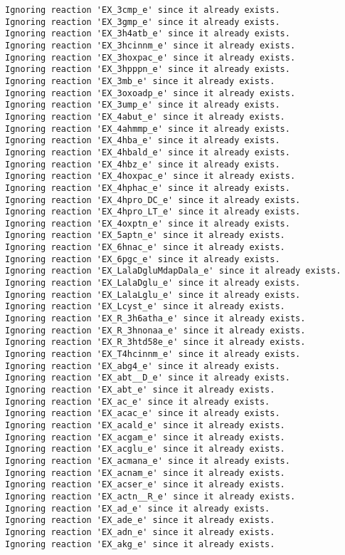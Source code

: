 \documentclass[
  letterpaper,
  DIV=11,
  numbers=noendperiod]{scrartcl}
\begin{document}
\begin{verbatim}
Ignoring reaction 'EX_3cmp_e' since it already exists.
Ignoring reaction 'EX_3gmp_e' since it already exists.
Ignoring reaction 'EX_3h4atb_e' since it already exists.
Ignoring reaction 'EX_3hcinnm_e' since it already exists.
Ignoring reaction 'EX_3hoxpac_e' since it already exists.
Ignoring reaction 'EX_3hpppn_e' since it already exists.
Ignoring reaction 'EX_3mb_e' since it already exists.
Ignoring reaction 'EX_3oxoadp_e' since it already exists.
Ignoring reaction 'EX_3ump_e' since it already exists.
Ignoring reaction 'EX_4abut_e' since it already exists.
Ignoring reaction 'EX_4ahmmp_e' since it already exists.
Ignoring reaction 'EX_4hba_e' since it already exists.
Ignoring reaction 'EX_4hbald_e' since it already exists.
Ignoring reaction 'EX_4hbz_e' since it already exists.
Ignoring reaction 'EX_4hoxpac_e' since it already exists.
Ignoring reaction 'EX_4hphac_e' since it already exists.
Ignoring reaction 'EX_4hpro_DC_e' since it already exists.
Ignoring reaction 'EX_4hpro_LT_e' since it already exists.
Ignoring reaction 'EX_4oxptn_e' since it already exists.
Ignoring reaction 'EX_5aptn_e' since it already exists.
Ignoring reaction 'EX_6hnac_e' since it already exists.
Ignoring reaction 'EX_6pgc_e' since it already exists.
Ignoring reaction 'EX_LalaDgluMdapDala_e' since it already exists.
Ignoring reaction 'EX_LalaDglu_e' since it already exists.
Ignoring reaction 'EX_LalaLglu_e' since it already exists.
Ignoring reaction 'EX_Lcyst_e' since it already exists.
Ignoring reaction 'EX_R_3h6atha_e' since it already exists.
Ignoring reaction 'EX_R_3hnonaa_e' since it already exists.
Ignoring reaction 'EX_R_3htd58e_e' since it already exists.
Ignoring reaction 'EX_T4hcinnm_e' since it already exists.
Ignoring reaction 'EX_abg4_e' since it already exists.
Ignoring reaction 'EX_abt__D_e' since it already exists.
Ignoring reaction 'EX_abt_e' since it already exists.
Ignoring reaction 'EX_ac_e' since it already exists.
Ignoring reaction 'EX_acac_e' since it already exists.
Ignoring reaction 'EX_acald_e' since it already exists.
Ignoring reaction 'EX_acgam_e' since it already exists.
Ignoring reaction 'EX_acglu_e' since it already exists.
Ignoring reaction 'EX_acmana_e' since it already exists.
Ignoring reaction 'EX_acnam_e' since it already exists.
Ignoring reaction 'EX_acser_e' since it already exists.
Ignoring reaction 'EX_actn__R_e' since it already exists.
Ignoring reaction 'EX_ad_e' since it already exists.
Ignoring reaction 'EX_ade_e' since it already exists.
Ignoring reaction 'EX_adn_e' since it already exists.
Ignoring reaction 'EX_akg_e' since it already exists.

\end{verbatim}
\end{document}
